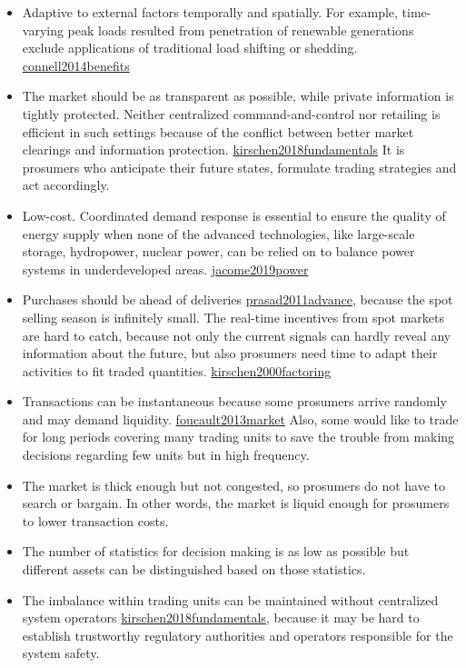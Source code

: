 \documentclass[letterpaper,8pt,twocolumn,twoside,]{pinp}
\providecommand{\tightlist}{%
  \setlength{\itemsep}{0pt}\setlength{\parskip}{0pt}}
\begin{document}
\begin{itemize}
\tightlist
\item
  Adaptive to external factors temporally and spatially. For example,
  time-varying peak loads resulted from penetration of renewable
  generations exclude applications of traditional load shifting or
  shedding. \protect\hyperlink{reference}{connell2014benefits}
\item
  The market should be as transparent as possible, while private
  information is tightly protected. Neither centralized
  command-and-control nor retailing is efficient in such settings
  because of the conflict between better market clearings and
  information protection.
  \protect\hyperlink{reference}{kirschen2018fundamentals} It is
  prosumers who anticipate their future states, formulate trading
  strategies and act accordingly.
\item
  Low-cost. Coordinated demand response is essential to ensure the
  quality of energy supply when none of the advanced technologies, like
  large-scale storage, hydropower, nuclear power, can be relied on to
  balance power systems in underdeveloped areas.
  \protect\hyperlink{reference}{jacome2019power}
\item
  Purchases should be ahead of deliveries
  \protect\hyperlink{reference}{prasad2011advance}, because the spot
  selling season is infinitely small. The real-time incentives from spot
  markets are hard to catch, because not only the current signals can
  hardly reveal any information about the future, but also prosumers
  need time to adapt their activities to fit traded quantities.
  \protect\hyperlink{reference}{kirschen2000factoring}
\item
  Transactions can be instantaneous because some prosumers arrive
  randomly and may demand liquidity.
  \protect\hyperlink{reference}{foucault2013market} Also, some would
  like to trade for long periods covering many trading units to save the
  trouble from making decisions regarding few units but in high
  frequency.
\item
  The market is thick enough but not congested, so prosumers do not have
  to search or bargain. In other words, the market is liquid enough for
  prosumers to lower transaction costs.
\item
  The number of statistics for decision making is as low as possible but
  different assets can be distinguished based on those statistics.
\item
  The imbalance within trading units can be maintained without
  centralized system operators
  \protect\hyperlink{reference}{kirschen2018fundamentals}, because it
  may be hard to establish trustworthy regulatory authorities and
  operators responsible for the system safety.
\end{itemize}
\end{document}
